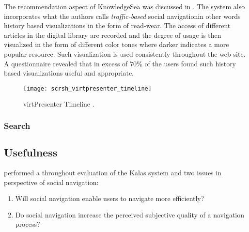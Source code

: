 The recommendation aspect of KnowledgeSea was discussed in
.
The system also incorporates what the authors calls \emph{traffic-based}
\citep[p.~12]{brusilovsky05}
social navigation\dash{}in other words history based visualizations in the
form of read-wear. The access of different articles in the digital library are
recorded and the degree of usage is then visualized in the form of different
color tones where darker indicates a more popular resource. Such
visualization is used consistently throughout the web site. A questionnaire
revealed that in excess of 70\% \citeyearpar[p.15]{brusilovsky05} of the users
found such history based visualizations useful and appropriate.

\begin{figure}
  \texttt{[image: scrsh\_virtpresenter\_timeline]}
  \caption[virtPresenter Timeline]{
    virtPresenter Timeline \citep[p.~43]{mertens06}.
  }
  \label{figure:scrsh.virtpresenter.timeline}
\end{figure}


\subsubsection{Search}

\subsection{Usefulness}

\citet{svensson05} performed a throughout evaluation of the Kalas system and
two issues in perspective of social navigation:
\begin{enumerate}
  \item Will social navigation enable users to navigate more efficiently?
  \item Do social navigation increase the perceived subjective quality of
    a navigation process?
\end{enumerate}

